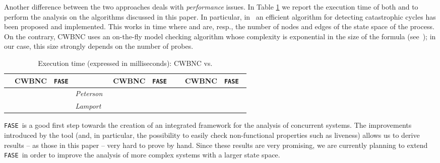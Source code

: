 \documentclass[copyright,creativecommons]{eptcs}
\newcommand{\fase}{\texttt{FASE}}
\newcommand{\peterson}{{\it Peterson}}
\newcommand{\lamport}{{\it Lamport}}
\begin{document}
Another difference between the two approaches deals with {\em performance}
issues. In Table \ref{tab:comparing3} we report the execution time of both  and  to perform the analysis on the algorithms discussed in this paper. 
In particular, in~\cite{BCCDV09} an efficient algorithm for detecting catastrophic
cycles has been proposed and implemented. This works in time 
where  and  are, resp., the number of nodes and edges of the
state space of the process. On the contrary, CWBNC uses an on-the-fly model
checking algorithm whose complexity is exponential in the size of the
formula (see~\cite{CLS00}); in our case, this size strongly depends
on the number of probes.

\begin{table}
\centering
\small
\begin{tabular}{l c c l c c l c c}
 & CWBNC & \fase & &  CWBNC & \fase\  & &  CWBNC & \fase\  \\ \hline
\midrule
 &   &  & \peterson\ & \ & \
&  & \ & \ \\
 & \ & \ & \lamport\ & \ & \ \\
\midrule
\end{tabular}
\caption{Execution time (expressed in milliseconds): CWBNC vs. }
\label{tab:comparing3}
\end{table}

\fase\ is a good first step towards the creation of an integrated
framework for the analysis of concurrent systems. The improvements
introduced by the tool (and, in particular, the possibility to easily
check non-functional properties such as liveness) allows us to derive
results -- as those in this paper -- very hard to prove by hand. Since
these results are very promising, we are currently planning to extend
\fase\ in order to improve the analysis of more complex systems with a
larger state space.



\end{document}
